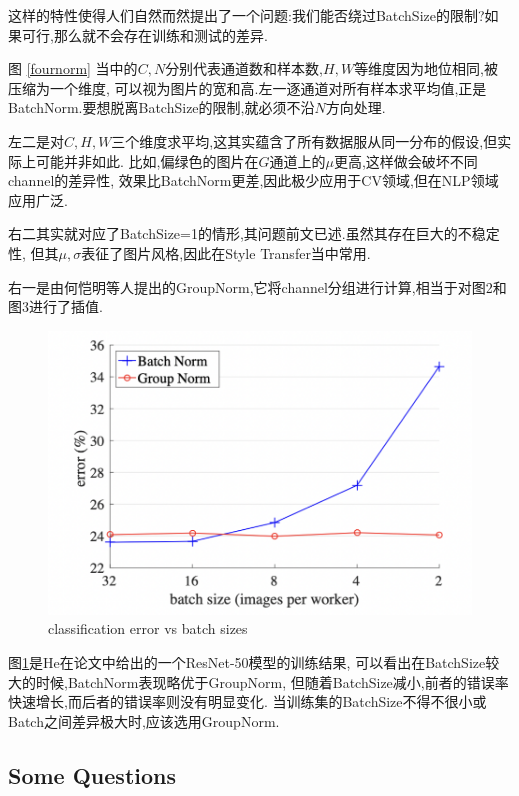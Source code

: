 这样的特性使得人们自然而然提出了一个问题:我们能否绕过BatchSize的限制?如果可行,那么就不会存在训练和测试的差异.

图 \ref{fournorm} 当中的$C,N$分别代表通道数和样本数,$H,W$等维度因为地位相同,被压缩为一个维度,
可以视为图片的宽和高.左一逐通道对所有样本求平均值,正是BatchNorm.要想脱离BatchSize的限制,就必须不沿$N$方向处理.

左二是对$C,H,W$三个维度求平均,这其实蕴含了所有数据服从同一分布的假设,但实际上可能并非如此.
比如,偏绿色的图片在$G$通道上的$\mu$更高,这样做会破坏不同channel的差异性,
效果比BatchNorm更差,因此极少应用于CV领域,但在NLP领域应用广泛.

右二其实就对应了BatchSize=1的情形,其问题前文已述.虽然其存在巨大的不稳定性,
但其$\mu, \sigma$表征了图片风格,因此在Style Transfer当中常用.

右一是由何恺明等人提出的GroupNorm,它将channel分组进行计算,相当于对图2和图3进行了插值.

\begin{figure}[H]
	\centering
	\includegraphics[scale=0.30]{figures/GroupNorm.png}
	\caption{classification error vs batch sizes}
	\label{groupNorm}
\end{figure}

图\ref{groupNorm}是He在论文中给出的一个ResNet-50模型的训练结果,
可以看出在BatchSize较大的时候,BatchNorm表现略优于GroupNorm,
但随着BatchSize减小,前者的错误率快速增长,而后者的错误率则没有明显变化.
当训练集的BatchSize不得不很小或Batch之间差异极大时,应该选用GroupNorm.

\subsection{Some Questions}

